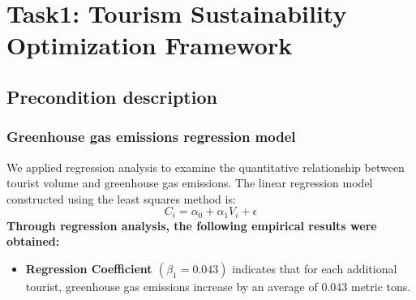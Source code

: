 \documentclass{mcmthesis}
\begin{document}
  
\section{Task1: Tourism Sustainability Optimization Framework}
\subsection{Precondition description}
\subsubsection{Greenhouse gas emissions regression model}
We applied regression analysis to examine the quantitative relationship between tourist volume and greenhouse gas emissions. The linear regression model constructed using the least squares method is:
\begin{equation}
  C_i = \alpha_0 + \alpha_1 V_i + \epsilon 
\end{equation}
\textbf{Through regression analysis, the following empirical results were obtained:}
\begin{itemize}
  \item \textbf{Regression Coefficient $(\beta_1= 0.043)$} indicates that for each additional tourist, greenhouse gas emissions increase by an average of 0.043 metric tons.
\end{itemize}
\end{document}
